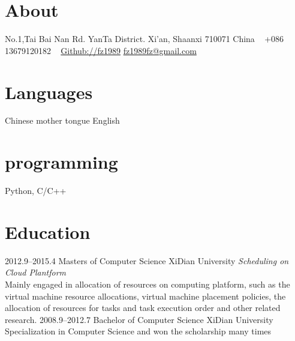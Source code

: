 \documentclass[]{friggeri-cv} %
\begin{document}


\begin{aside} %
\section{About}
    No.1,Tai Bai Nan Rd.
    YanTa District.
    Xi'an, Shaanxi 710071
    China
    ~
    +086 13679120182
    ~
    \href{https://github.com/fz1989}{Github://fz1989}
    \href{mailto:fz1989fz@gmail.com}{fz1989fz@gmail.com}
\section{Languages}
Chinese mother tongue
English
\section{programming}
Python, C/C++
\end{aside}

\section{Education}

\begin{entrylist}
\entry
{2012.9--2015.4}
{Masters {\normalfont of Computer Science}}
{XiDian University}
{\emph{Scheduling on Cloud Plantform} \\Mainly engaged in allocation of resources on computing platform, such as the virtual machine resource allocations, virtual machine placement policies, the allocation of resources for tasks and task execution order and other related research.}
\entry
{2008.9--2012.7}
{Bachelor {\normalfont of Computer Science}}
{XiDian University}
{Specialization in Computer Science and won the scholarship many times}
\end{entrylist}
\end{document}
